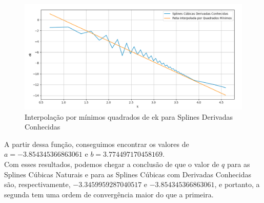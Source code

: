 \documentclass[12pt]{article}
\begin{document}
\begin{figure}[H]
  \begin{center}
    \includegraphics[width=0.8\linewidth]{splines_derivadas_quadrados.png}
  \end{center}
  \caption{Interpolação por mínimos quadrados de ek para Splines Derivadas Conhecidas}
  \label{fig:leastsquares1}
\end{figure}

A partir dessa função, conseguimos encontrar os valores de $a = -3.854345366863061$ e $b = 3.774497170458169$.\\
Com esses resultados, podemos chegar a conclusão de que o valor de $q$ para as Splines Cúbicas Naturais e para as Splines Cúbicas com Derivadas Conhecidas são, respectivamente, $-3.3459959287040517$ e $-3.854345366863061$, e portanto, a segunda tem uma ordem de convergência maior do que a primeira.
\end{document}

